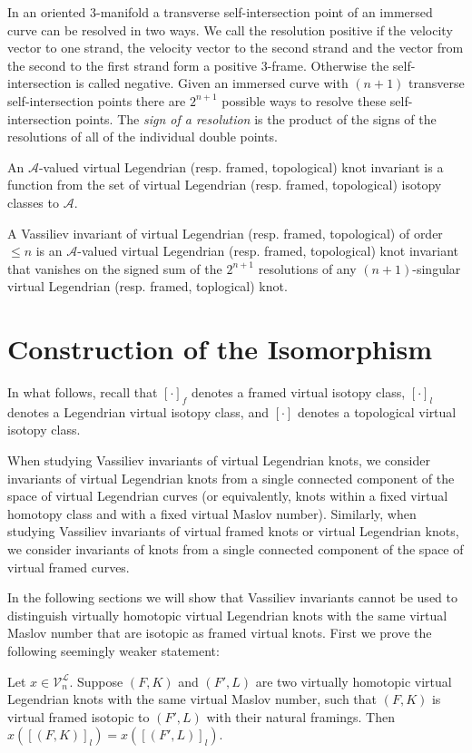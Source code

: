 In an oriented $3$-manifold a transverse self-intersection point of an immersed curve can be resolved in two ways.  We call the resolution positive if the velocity vector to one strand, the velocity vector to the second strand and the vector from the second to the first strand form a positive $3$-frame.  Otherwise the self-intersection is called negative.  Given an immersed curve with $(n+1)$ transverse self-intersection points there are $2^{n+1}$ possible ways to resolve these self-intersection points. The {\it sign of a resolution} is the product of the signs of the resolutions of all of the individual double points. 

An $\mathcal{A}$-valued virtual Legendrian (resp. framed, topological) knot invariant is a function from the set of virtual Legendrian (resp. framed, topological) isotopy classes to $\mathcal{A}$.

A Vassiliev invariant of virtual Legendrian (resp. framed, topological) of order $\leq n$ is an $\mathcal{A}$-valued virtual Legendrian (resp. framed, topological) knot invariant that vanishes on the signed sum of the $2^{n+1}$ resolutions of any $(n+1)$-singular virtual Legendrian (resp. framed, toplogical) knot.
 
\section{Construction of the Isomorphism}
In what follows, recall that $[\cdot]_f$ denotes a framed virtual isotopy class, $[\cdot]_l$ denotes a Legendrian virtual isotopy class, and $[\cdot]$ denotes a topological virtual isotopy class.

When studying Vassiliev invariants of virtual Legendrian knots, we consider invariants of virtual Legendrian knots from a single connected component of the space of virtual Legendrian curves (or equivalently, knots within a fixed virtual homotopy class and with a fixed virtual Maslov number).   Similarly, when studying Vassiliev invariants of virtual framed knots or virtual Legendrian knots, we consider invariants of knots from a single connected component of the space of virtual framed curves.

In the following sections we will show that Vassiliev invariants cannot be used to distinguish virtually homotopic virtual Legendrian knots with the same virtual Maslov number that are isotopic as framed virtual knots.  First we prove the following seemingly weaker statement:

\begin{thm} \label{statementA}
Let $x\in \mathcal{V}_n^\mathcal{L}$.  Suppose $(F, K)$ and $(F', L)$ are two virtually homotopic virtual Legendrian knots with the same virtual Maslov number, such that $(F, K)$ is virtual framed isotopic to $(F', L)$ with their natural framings.   Then $x([(F, K)]_l) = x([(F', L)]_l)$.
\end{thm}

